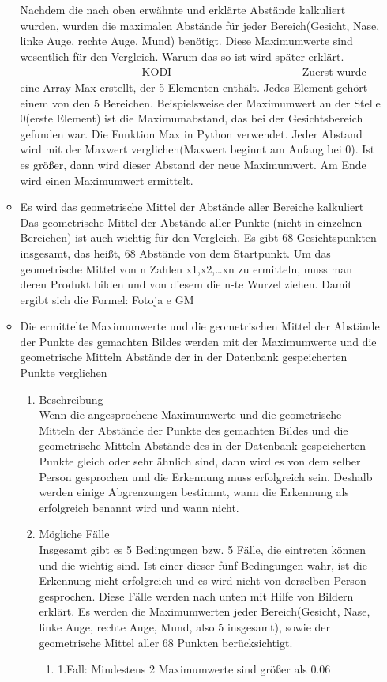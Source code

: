 \begin{enumerate}
\begin{itemize}
	Nachdem die nach oben erwähnte und erklärte Abstände kalkuliert wurden, wurden die maximalen Abstände für jeder Bereich(Gesicht, Nase, linke Auge, rechte Auge, Mund) benötigt. Diese Maximumwerte sind wesentlich für den Vergleich. Warum das so ist wird später erklärt. 
	---------------------------------KODI-----------------------------------
	Zuerst wurde eine Array Max erstellt, der 5 Elementen enthält. Jedes Element gehört einem von den 5 Bereichen. Beispielsweise der Maximumwert an der Stelle 0(erste Element) ist die Maximumabstand, das bei der Gesichtsbereich gefunden war. Die Funktion Max in Python verwendet. Jeder Abstand wird mit der Maxwert verglichen(Maxwert beginnt am Anfang bei 0). Ist es größer, dann wird dieser Abstand der neue Maximumwert. Am Ende wird einen Maximumwert ermittelt.
	
	\item Es wird das geometrische Mittel der Abstände aller Bereiche kalkuliert \\
	
	Das geometrische Mittel der Abstände aller Punkte (nicht in einzelnen Bereichen) ist auch wichtig für den Vergleich. Es gibt 68 Gesichtspunkten insgesamt, das heißt, 68 Abstände von dem Startpunkt. 
	Um das geometrische Mittel von n Zahlen x1,x2,…xn zu ermitteln, muss man deren Produkt bilden und von diesem die n-te Wurzel ziehen.
	Damit ergibt sich die Formel:
	Fotoja e GM
	
	\item Die ermittelte Maximumwerte und die geometrischen Mittel der Abstände der Punkte des gemachten Bildes werden mit der Maximumwerte und die geometrische Mitteln Abstände der in der Datenbank gespeicherten Punkte verglichen \\
	
	\begin{enumerate}
		\item Beschreibung \\
		
		Wenn die angesprochene Maximumwerte und die geometrische Mitteln der Abstände der Punkte des gemachten Bildes und die geometrische Mitteln Abstände des in der Datenbank gespeicherten Punkte gleich oder sehr ähnlich sind, dann wird es von dem selber Person gesprochen und die Erkennung muss erfolgreich sein. Deshalb werden einige Abgrenzungen bestimmt, wann die Erkennung als erfolgreich benannt wird und wann nicht.
		\item Mögliche Fälle \\
		
		Insgesamt gibt es 5 Bedingungen bzw. 5 Fälle, die eintreten können und die wichtig sind. Ist einer dieser fünf Bedingungen wahr, ist die Erkennung nicht erfolgreich und es wird nicht von derselben Person gesprochen. Diese Fälle werden nach unten mit Hilfe von Bildern erklärt. Es werden die Maximumwerten jeder Bereich(Gesicht, Nase, linke Auge, rechte Auge, Mund, also 5 insgesamt), sowie der geometrische Mittel aller 68 Punkten berücksichtigt.
		\begin{enumerate}
			\item 1.Fall: Mindestens 2 Maximumwerte sind größer als 0.06 \\
			

\end{enumerate}
\end{enumerate}
\end{itemize}
\end{enumerate}
